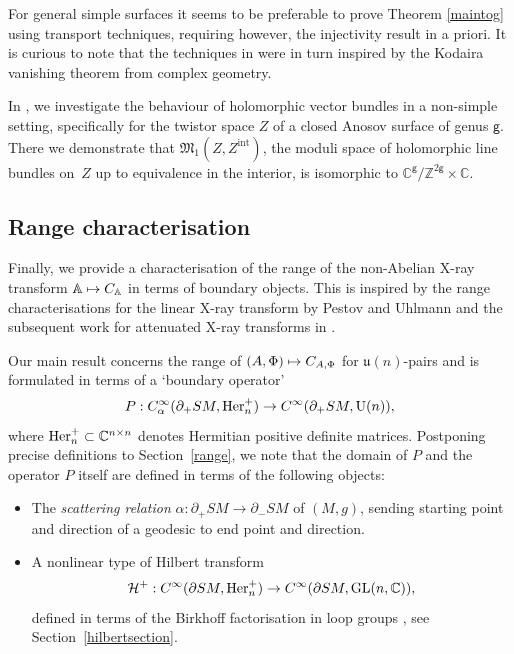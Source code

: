 \documentclass[JEP,XML,SOM,Unicode,published]{cedram}
\newcommand\mto{\mathchoice{\longmapsto}{\mapsto}{\mapsto}{\mapsto}}
\DeclareMathOperator{\GL}{GL}
\newcommand{\rU}{\mathrm{U}}
\theoremstyle{plain}
\theoremstyle{definition}
\newcommand{\A}{\mathbb{A}}
\newcommand{\Z}{\mathbb{Z}}
\newcommand{\C}{\mathbb{C}}
\renewcommand{\H}{\mathcal{H}}
\newcommand{\M}{\mathfrak{M}}
\renewcommand{\u}{\mathfrak{u}}
\newcommand{\he}{\textup{Her}}
\newcommand{\interior}{\mathrm{int}}
\newcommand{\1}{{\bf 1}}
\begin{document}
For general simple surfaces it seems to be preferable to prove Theorem \ref{maintog} using transport techniques, requiring however, the injectivity result in \cite{PSU12} a priori. It is curious to note that the techniques in \cite{PSU12} were in turn inspired by the Kodaira vanishing theorem from complex geometry.

In \cite{BLP23}, we investigate the behaviour of holomorphic vector bundles in a non-simple setting, specifically for the twistor space $Z$ of a closed Anosov surface of genus $\mathsf g$. There we demonstrate that $\M_1(Z,Z^\interior)$, the moduli space of holomorphic line bundles on~$Z$ up to equivalence in the interior, is isomorphic to $\C^\mathsf{g}/\Z^{2\mathsf{g}}\times \C$.

\subsection{Range characterisation}\label{introrange} Finally, we provide a characterisation of the range of the non-Abelian X-ray transform $\A\mto C_\A$ in terms of boundary objects. This is inspired by the range characterisations for the linear X-ray transform by Pestov and Uhlmann \cite{PeUh04} and the subsequent work for attenuated X-ray transforms in \cite{PSU15,AMU18}.

Our main result concerns the range of $(A,\Phi)\mto C_{A,\Phi}$ for $\u(n)$-pairs and is formulated in terms of a `boundary operator'
\begin{equation*}
P:C_\alpha^\infty(\partial_+SM,\he^+_n) \to C^\infty(\partial_+SM,\rU(n)),
\end{equation*}
where $\he^+_n\subset \C^{n\times n}$ denotes Hermitian positive definite matrices. Postponing precise definitions to Section~\ref{range}, we note that the domain of $P$ and the operator $P$ itself are defined in terms of the following objects:
\begin{itemize}
\item The \emph{scattering relation} $\alpha:\partial_+ SM\to \partial_- SM$ of $(M,g)$, sending starting point and direction of a geodesic to end point and direction.
\item A nonlinear type of Hilbert transform
\begin{equation*}\H^+:C^\infty(\partial SM,\he^+_n)\to C^\infty(\partial SM,\GL(n,\C)),
\end{equation*}
defined in terms of the Birkhoff factorisation in loop groups \cite{PS86}, see Section~\ref{hilbertsection}.
\end{itemize}
\end{document}
